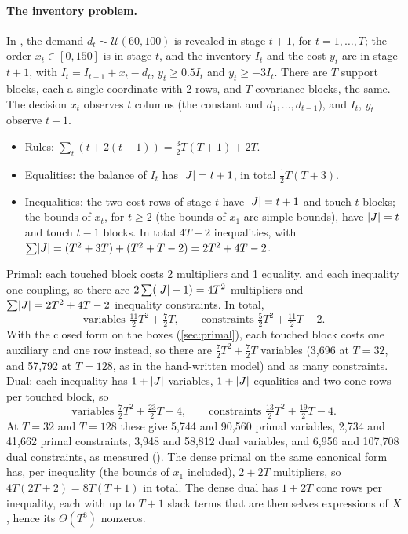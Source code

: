 \paragraph{The inventory problem.}
In , the demand $d_t \sim \mathcal{U}(60, 100)$ is revealed in stage $t+1$, for $t = 1, \dots, T$;
the order $x_t \in [0, 150]$ is in stage $t$, and the inventory $I_t$ and the cost $y_t$ are in stage $t+1$, with
$I_t = I_{t-1} + x_t - d_t$, $y_t \ge 0.5 I_t$ and $y_t \ge -3I_t$.
There are $T$ support blocks, each a single coordinate with 2 rows, and $T$ covariance blocks, the same.
The decision $x_t$ observes $t$ columns (the constant and $d_1, \dots, d_{t-1}$), and $I_t$, $y_t$ observe $t+1$.
\begin{itemize}[nosep]
\item Rules: $\sum_t (t + 2(t+1)) = \frac32T(T+1) + 2T$.
\item Equalities: the balance of $I_t$ has $\lvert J \rvert = t+1$, in total $\frac12T(T+3)$.
\item Inequalities: the two cost rows of stage $t$ have $\lvert J \rvert = t+1$ and touch $t$ blocks;
the bounds of $x_t$, for $t \ge 2$ (the bounds of $x_1$ are simple bounds), have $\lvert J \rvert = t$ and touch $t-1$ blocks.
In total $4T - 2$ inequalities, with $\sum\lvert J \rvert = (T^2 + 3T) + (T^2 + T - 2) = 2T^2 + 4T - 2$.
\end{itemize}
Primal: each touched block costs 2 multipliers and 1 equality, and each inequality one coupling, so
there are $2\sum(\lvert J \rvert - 1) = 4T^2$ multipliers and $\sum\lvert J \rvert = 2T^2 + 4T - 2$ inequality constraints. In total,
\[
\text{variables } \tfrac{11}{2}T^2 + \tfrac72T, \qquad \text{constraints } \tfrac52T^2 + \tfrac{11}{2}T - 2.
\]
With the closed form on the boxes (\cref{sec:primal}), each touched block costs one auxiliary and one row instead, so there are $\tfrac72T^2 + \tfrac72T$ variables (3,696 at $T = 32$, and 57,792 at $T = 128$, as in the hand-written model) and as many constraints.
Dual: each inequality has $1 + \lvert J \rvert$ variables, $1 + \lvert J \rvert$ equalities and two cone rows per touched block, so
\[
\text{variables } \tfrac72T^2 + \tfrac{23}{2}T - 4, \qquad \text{constraints } \tfrac{13}{2}T^2 + \tfrac{19}{2}T - 4.
\]
At $T = 32$ and $T = 128$ these give 5,744 and 90,560 primal variables, 2,734 and 41,662 primal constraints, 3,948 and 58,812 dual variables, and 6,956 and 107,708 dual constraints, as measured ().
The dense primal on the same canonical form has, per inequality (the bounds of $x_1$ included), $2 + 2T$ multipliers, so $4T(2T + 2) = 8T(T+1)$ in total.
The dense dual has $1 + 2T$ cone rows per inequality, each with up to $T + 1$ slack terms that are themselves expressions of $X$, hence its $\Theta(T^3)$ nonzeros.
